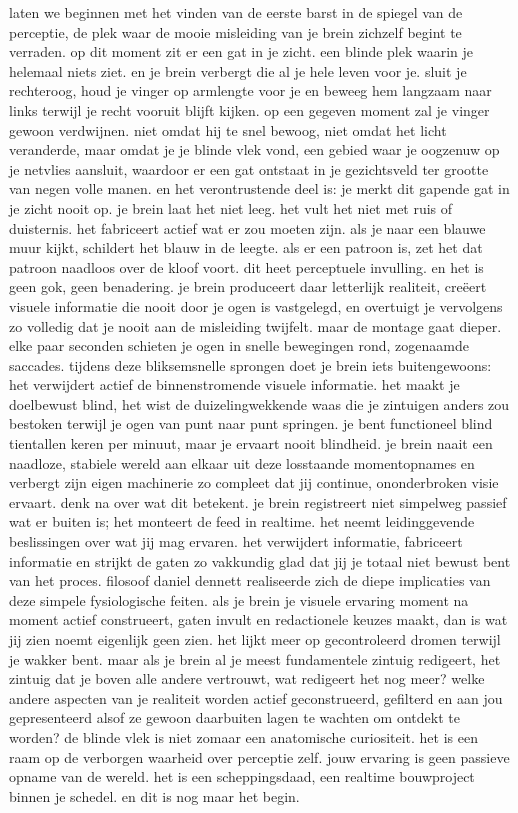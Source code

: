 laten we beginnen met het vinden van de eerste barst in de spiegel van de perceptie, de plek waar de mooie misleiding van je brein zichzelf begint te verraden. op dit moment zit er een gat in je zicht. een blinde plek waarin je helemaal niets ziet. en je brein verbergt die al je hele leven voor je. sluit je rechteroog, houd je vinger op armlengte voor je en beweeg hem langzaam naar links terwijl je recht vooruit blijft kijken. op een gegeven moment zal je vinger gewoon verdwijnen. niet omdat hij te snel bewoog, niet omdat het licht veranderde, maar omdat je je blinde vlek vond, een gebied waar je oogzenuw op je netvlies aansluit, waardoor er een gat ontstaat in je gezichtsveld ter grootte van negen volle manen. en het verontrustende deel is: je merkt dit gapende gat in je zicht nooit op. je brein laat het niet leeg. het vult het niet met ruis of duisternis. het fabriceert actief wat er zou moeten zijn. als je naar een blauwe muur kijkt, schildert het blauw in de leegte. als er een patroon is, zet het dat patroon naadloos over de kloof voort. dit heet perceptuele invulling. en het is geen gok, geen benadering. je brein produceert daar letterlijk realiteit, creëert visuele informatie die nooit door je ogen is vastgelegd, en overtuigt je vervolgens zo volledig dat je nooit aan de misleiding twijfelt.
maar de montage gaat dieper. elke paar seconden schieten je ogen in snelle bewegingen rond, zogenaamde saccades. tijdens deze bliksemsnelle sprongen doet je brein iets buitengewoons: het verwijdert actief de binnenstromende visuele informatie. het maakt je doelbewust blind, het wist de duizelingwekkende waas die je zintuigen anders zou bestoken terwijl je ogen van punt naar punt springen. je bent functioneel blind tientallen keren per minuut, maar je ervaart nooit blindheid. je brein naait een naadloze, stabiele wereld aan elkaar uit deze losstaande momentopnames en verbergt zijn eigen machinerie zo compleet dat jij continue, ononderbroken visie ervaart.
denk na over wat dit betekent. je brein registreert niet simpelweg passief wat er buiten is; het monteert de feed in realtime. het neemt leidinggevende beslissingen over wat jij mag ervaren. het verwijdert informatie, fabriceert informatie en strijkt de gaten zo vakkundig glad dat jij je totaal niet bewust bent van het proces. filosoof daniel dennett realiseerde zich de diepe implicaties van deze simpele fysiologische feiten. als je brein je visuele ervaring moment na moment actief construeert, gaten invult en redactionele keuzes maakt, dan is wat jij zien noemt eigenlijk geen zien. het lijkt meer op gecontroleerd dromen terwijl je wakker bent. maar als je brein al je meest fundamentele zintuig redigeert, het zintuig dat je boven alle andere vertrouwt, wat redigeert het nog meer? welke andere aspecten van je realiteit worden actief geconstrueerd, gefilterd en aan jou gepresenteerd alsof ze gewoon daarbuiten lagen te wachten om ontdekt te worden? de blinde vlek is niet zomaar een anatomische curiositeit. het is een raam op de verborgen waarheid over perceptie zelf. jouw ervaring is geen passieve opname van de wereld. het is een scheppingsdaad, een realtime bouwproject binnen je schedel. en dit is nog maar het begin.
